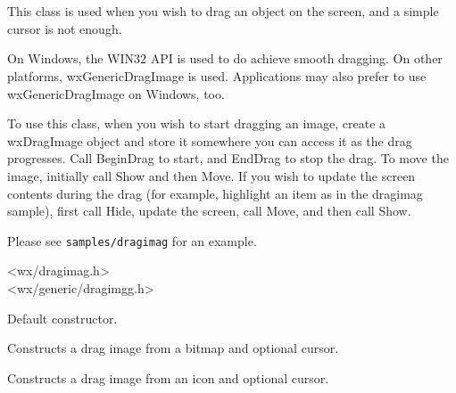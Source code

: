 \section{}\label{wxdragimage}

This class is used when you wish to drag an object on the screen,
and a simple cursor is not enough.

On Windows, the WIN32 API is used to do achieve smooth dragging. On other platforms,
wxGenericDragImage is used. Applications may also prefer to use
wxGenericDragImage on Windows, too.

To use this class, when you wish to start dragging an image, create a wxDragImage
object and store it somewhere you can access it as the drag progresses.
Call BeginDrag to start, and EndDrag to stop the drag. To move the image,
initially call Show and then Move. If you wish to update the screen contents
during the drag (for example, highlight an item as in the dragimag sample), first call Hide,
update the screen, call Move, and then call Show.

Please see {\tt samples/dragimag} for an example.




<wx/dragimag.h>\\
<wx/generic/dragimgg.h>


\label{wxdragimageconstr}


Default constructor.


Constructs a drag image from a bitmap and optional cursor.


Constructs a drag image from an icon and optional cursor.


